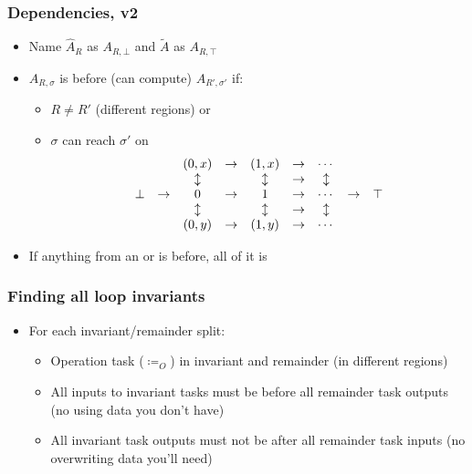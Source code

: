\documentclass{beamer}
\begin{document}
\begin{frame}
  \frametitle{Dependencies, v2}
  \begin{itemize}
  \item Name $\hat{A}_R$ as $A_{R, \bot}$ and $\widetilde{A}$ as $A_{R, \top}$
  \item $A_{R, \sigma}$ is before (can compute) $A_{R', \sigma'}$ if:
    \begin{itemize}
    \item $R \neq R'$ (different regions) or
    \item $\sigma$ can reach $\sigma'$ on
      \begin{equation*}
        \begin{array}{c c c c c c c c c}
           & &(0, x)&\to&(1, x)&\to&\cdots& &\\
           & &\updownarrow     & &\updownarrow     &\to&\updownarrow& &\\
          \bot&\to&0     &\to&1     &\to&\cdots&\to&\top\\
           & &\updownarrow     & &\updownarrow     &\to&\updownarrow& &\\
           & &(0, y)&\to&(1, y)&\to&\cdots& &\\
        \end{array}
      \end{equation*}
    \end{itemize}
  \item If anything from an or is before, all of it is
  \end{itemize}
\end{frame}

\begin{frame}
  \frametitle{Finding all loop invariants}
  \begin{itemize}
  \item For each invariant/remainder split:
    \begin{itemize}
    \item Operation task ($\coloneqq_O$) in invariant and remainder (in different regions)
    \item All inputs to invariant tasks must be before all remainder task outputs (no using data you don't have)
    \item All invariant task outputs must not be after all remainder task inputs (no overwriting data you'll need)
    \end{itemize}
  \end{itemize}
\end{frame}
\end{document}
